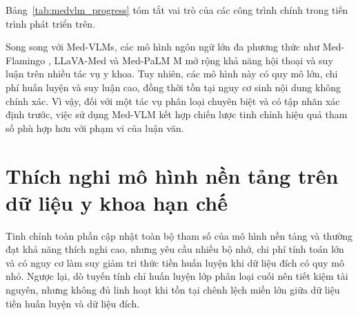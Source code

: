 Bảng~\ref{tab:medvlm_progress} tóm tắt vai trò của các công trình chính trong tiến trình phát triển trên.

\begin{table}[H]
\centering
{}
\caption{Tiến trình giải quyết hạn chế của các mô hình ngôn ngữ-thị giác y khoa có liên quan đến luận văn.}
\label{tab:medvlm_progress}
\end{table}

Song song với Med-VLMs, các mô hình ngôn ngữ lớn đa phương thức như Med-Flamingo \cite{moor_2023_medflamingo}, LLaVA-Med \cite{li_2023_llavamed} và Med-PaLM M \cite{MED-PALM-M} mở rộng khả năng hội thoại và suy luận trên nhiều tác vụ y khoa. Tuy nhiên, các mô hình này có quy mô lớn, chi phí huấn luyện và suy luận cao, đồng thời tồn tại nguy cơ sinh nội dung không chính xác. Vì vậy, đối với một tác vụ phân loại chuyên biệt và có tập nhãn xác định trước, việc sử dụng Med-VLM kết hợp chiến lược tinh chỉnh hiệu quả tham số phù hợp hơn với phạm vi của luận văn.

\section{Thích nghi mô hình nền tảng trên dữ liệu y khoa hạn chế}
\label{sec:peft_related}

Tinh chỉnh toàn phần cập nhật toàn bộ tham số của mô hình nền tảng và thường đạt khả năng thích nghi cao, nhưng yêu cầu nhiều bộ nhớ, chi phí tính toán lớn và có nguy cơ làm suy giảm tri thức tiền huấn luyện khi dữ liệu đích có quy mô nhỏ. Ngược lại, dò tuyến tính chỉ huấn luyện lớp phân loại cuối nên tiết kiệm tài nguyên, nhưng không đủ linh hoạt khi tồn tại chênh lệch miền lớn giữa dữ liệu tiền huấn luyện và dữ liệu đích.

